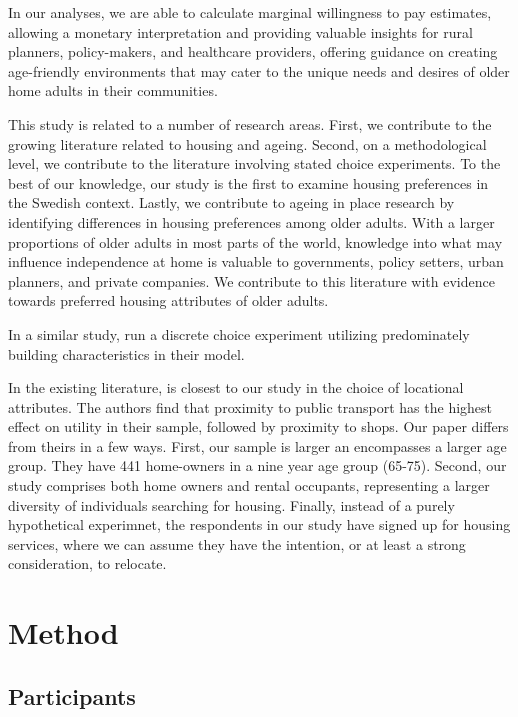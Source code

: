 \documentclass[3p,11pt ]{elsarticle}
\begin{document}
In our analyses, 
we are able to calculate marginal willingness to pay estimates,
allowing a monetary interpretation and providing valuable insights for rural planners, policy-makers, and healthcare providers, offering guidance on creating age-friendly environments that may cater to the unique needs and desires of older home adults in their communities.


This study is related to a number of research areas.
First,
we contribute to the growing literature related to housing and ageing.
Second,
on a methodological level, we contribute to the literature involving stated choice experiments.
To the best of our knowledge,
our study is the first to examine housing preferences in the Swedish context.
Lastly,
we contribute to ageing in place research by identifying differences in housing preferences among older adults.
With a larger proportions of older adults in most parts of the world,
knowledge into what may influence independence at home is valuable to governments, policy setters, urban planners, and private companies.
We contribute to this literature with evidence towards preferred housing attributes of older adults.


In a similar study,\cite{ossokinaBestLivingConcepts2020} 
run a discrete choice experiment utilizing predominately building characteristics in their model.

In the existing literature,
\cite{ossokinaReferencedependentHousingChoice2022a} is closest to our study in the choice of locational attributes.
The authors find that proximity to public transport has the highest effect on utility in their sample, followed by proximity to shops.
Our paper differs from theirs in a few ways.
First,
our sample is larger an encompasses a larger age group.
They have 441 home-owners in a nine year age group (65-75).
Second,
our study comprises both home owners and rental occupants, representing a larger diversity of individuals searching for housing.
Finally,
instead of a purely hypothetical experimnet, the respondents in our study have signed up for housing services, where we can assume they have the intention, or at least a strong consideration, to relocate.





\section{Method}

\subsection{Participants}
\end{document}
